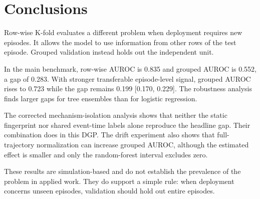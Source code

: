 \documentclass[runningheads]{llncs}
\newcommand{\1}{\mathbf{1}}
\begin{document}
\section{Conclusions}\label{sec:conclusion}

Row-wise K-fold evaluates a different problem when deployment requires new episodes. It allows the model to use information from other rows of the test episode. Grouped validation instead holds out the independent unit.

In the main benchmark, row-wise AUROC is 0.835 and grouped AUROC is 0.552, a gap of 0.283. With stronger transferable episode-level signal, grouped AUROC rises to 0.723 while the gap remains 0.199 [0.170, 0.229]. The robustness analysis finds larger gaps for tree ensembles than for logistic regression.

The corrected mechanism-isolation analysis shows that neither the static fingerprint nor shared event-time labels alone reproduce the headline gap. Their combination does in this DGP. The drift experiment also shows that full-trajectory normalization can increase grouped AUROC, although the estimated effect is smaller and only the random-forest interval excludes zero.

These results are simulation-based and do not establish the prevalence of the problem in applied work. They do support a simple rule: when deployment concerns unseen episodes, validation should hold out entire episodes.



\end{document}

